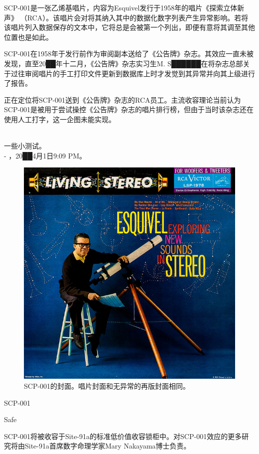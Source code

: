 SCP-001是一张乙烯基唱片，内容为Esquivel发行于1958年的唱片《探索立体新声》 （RCA）。该唱片会对将其纳入其中的数据化数字列表产生异常影响。若将该唱片列入数据保存的文本中，它将总是会被第一个列出，即便有意将其调至其他位置也是如此。

SCP-001在1958年于发行前作为审阅副本送给了《公告牌》杂志。其效应一直未被发现，直至20██年十二月，《公告牌》杂志实习生M. S██████在将杂志总部关于过往审阅唱片的手工打印文件更新到数据库上时才发觉到其异常并向其上级进行了报告。

正在定位将SCP-001送到《公告牌》杂志的RCA员工。主流收容理论当前认为SCP-001是被用于尝试操控《公告牌》杂志的唱片排行榜，但由于当时该杂志还在使用人工打字，这一企图未能实现。


\newpage



\begin{scpbox}
 \\
一些小测试。 \\
- ，20██4月1日9:09 PM。
\end{scpbox}

\begin{figure}[H]
	\centering
	\includegraphics[width=0.5\linewidth]{images/SCP-001-a-record-2.jpg}
	\caption*{SCP-001的封面。唱片封面和无异常的再版封面相同。}
\end{figure}

SCP-001

Safe

SCP-001将被收容于Site-91a的标准低价值收容锁柜中。对SCP-001效应的更多研究将由Site-91a首席数字命理学家Mary Nakayama博士负责。

